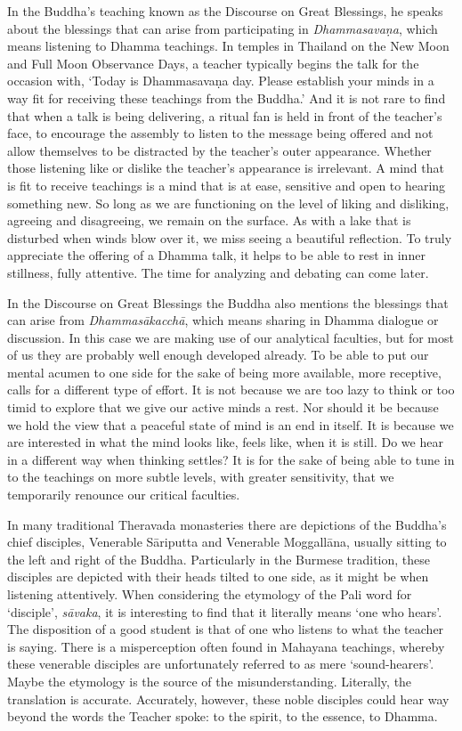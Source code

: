 In the Buddha’s teaching known as the Discourse on Great
Blessings\cite{mahamangala-sutta},
he speaks about the blessings that can arise from participating in
\emph{Dhammasavaṇa}, which means listening to Dhamma teachings. In temples in
Thailand on the New Moon and Full Moon Observance Days, a teacher
typically begins the talk for the occasion with, ‘Today is Dhammasavaṇa
day. Please establish your minds in a way fit for receiving these
teachings from the Buddha.’ And it is not rare to find that when a talk
is being delivering, a ritual fan is held in front of the teacher’s
face, to encourage the assembly to listen to the message being offered
and not allow themselves to be distracted by the teacher’s outer
appearance. Whether those listening like or dislike the teacher’s
appearance is irrelevant. A mind that is fit to receive teachings is a
mind that is at ease, sensitive and open to hearing something new. So
long as we are functioning on the level of liking and disliking,
agreeing and disagreeing, we remain on the surface. As with a lake that
is disturbed when winds blow over it, we miss seeing a beautiful
reflection. To truly appreciate the offering of a Dhamma talk, it helps
to be able to rest in inner stillness, fully attentive. The time for
analyzing and debating can come later.

In the Discourse on Great Blessings the Buddha also mentions the
blessings that can arise from \emph{Dhammasākacchā}, which means sharing in
Dhamma dialogue or discussion. In this case we are making use of our
analytical faculties, but for most of us they are probably well enough
developed already. To be able to put our mental acumen to one side for
the sake of being more available, more receptive, calls for a different
type of effort. It is not because we are too lazy to think or too timid
to explore that we give our active minds a rest. Nor should it be
because we hold the view that a peaceful state of mind is an end in
itself. It is because we are interested in what the mind looks like,
feels like, when it is still. Do we hear in a different way when
thinking settles? It is for the sake of being able to tune in to the
teachings on more subtle levels, with greater sensitivity, that we
temporarily renounce our critical faculties.

In many traditional Theravada monasteries there are depictions of the
Buddha’s chief disciples, Venerable Sāriputta and Venerable Moggallāna,
usually sitting to the left and right of the Buddha. Particularly in the
Burmese tradition, these disciples are depicted with their heads tilted
to one side, as it might be when listening attentively. When considering
the etymology of the Pali word for ‘disciple’, \emph{sāvaka}, it is
interesting to find that it literally means ‘one who hears’. The
disposition of a good student is that of one who listens to what the
teacher is saying. There is a misperception often found in Mahayana
teachings, whereby these venerable disciples are unfortunately referred
to as mere ‘sound-hearers’. Maybe the etymology is the source of the
misunderstanding. Literally, the translation is accurate. Accurately,
however, these noble disciples could hear way beyond the words the
Teacher spoke: to the spirit, to the essence, to Dhamma.

